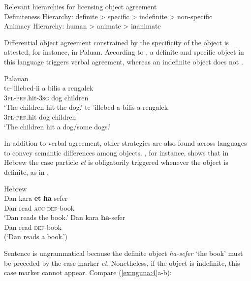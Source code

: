 \documentclass[output=paper]{langsci/langscibook}
\begin{document}
\ea\label{ex:nguna:1}
{Relevant hierarchies for licensing object agreement}\\
\ea\label{ex:nguna:}
  \textup{Definiteness Hierarchy: definite > specific > indefinite > non-specific}\\
\ex 
\textup{Animacy Hierarchy: human > animate > inanimate}\\
\z
\z

Differential object agreement constrained by the specificity of the object is attested, for instance, in Paluan. According to \citet[218]{Woolford2000}, a definite and specific object in this language triggers verbal agreement, whereas an indefinite object does not .

\ea\label{ex:nguna:2}
\ea
{Palauan {\citep[30]{Georgopoulos1991}}}\\
\gll te-’illebed-ii             a bilis          a rengalek\\
     \textsc{3pl-prf}.hit-\textsc{3sg}        dog              children\\
\glt ‘The children hit the dog.’
\ex
\gll te-’illebed           a bílis         a rengalek\\
     \textsc{3}{\textsc{pl}}-{\textsc{prf}}.hit         dog             children\\
\glt ‘The children hit a dog/some dogs.’
\z
\z



In addition to verbal agreement, other strategies are also found across languages to convey semantic differences among objects. \citet{Danon2002}, for instance, shows that in Hebrew the case particle {\textit{et}} is obligatorily triggered whenever the object is definite, as in .


\ea\label{ex:nguna:3}
{Hebrew \citep[1]{Danon2002}}\\
\ea
\gll Dan       kara       \textbf{et}       \textbf{ha}-sefer\\
     Dan       read       \textsc{acc}     \textsc{def}-book\\
\glt ‘Dan reads the book.’
\ex\label{ex:nguna:3b}
\gll *Dan       kara              \textbf{ha}-sefer\\
     Dan         read              \textsc{def}-book\\
\glt (‘Dan reads a book.’)
\z
\z



Sentence  is ungrammatical because the definite object {\textit{ha-sefer}} ‘the book’ must be preceded by the case marker {\textit{et}}. Nonetheless, if the object is indefinite, this case marker cannot appear. Compare (\ref{ex:nguna:4}a-b):
\end{document}
